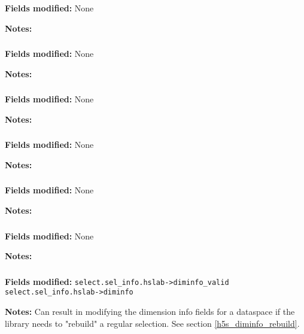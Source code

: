 \documentclass[../HDF5_RFC.tex]{subfiles}
\begin{document}
\textbf{Fields modified:} None

\textbf{Notes:}

\subsubsection{}

\textbf{Fields modified:} None

\textbf{Notes:}

\subsubsection{}

\textbf{Fields modified:} None

\textbf{Notes:}

\subsubsection{}

\textbf{Fields modified:} None

\textbf{Notes:}

\subsubsection{}

\textbf{Fields modified:} None

\textbf{Notes:}

\subsubsection{}

\textbf{Fields modified:} None

\textbf{Notes:}

\subsubsection{}

\textbf{Fields modified:} \texttt{select.sel\_info.hslab->diminfo\_valid} \\
\texttt{select.sel\_info.hslab->diminfo}

\textbf{Notes:} Can result in modifying the dimension info fields for a dataspace if the library needs
to "rebuild" a regular selection. See section \ref{h5s_diminfo_rebuild}.
\end{document}
